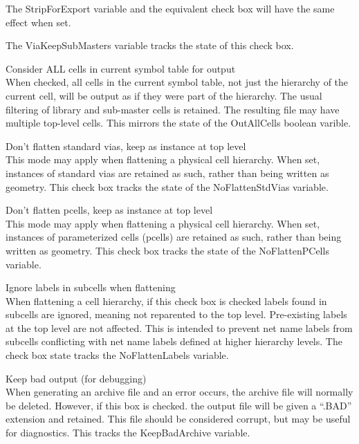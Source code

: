 \begin{description}
The {\et StripForExport} variable and the equivalent check box will
have the same effect when set.

The {\et ViaKeepSubMasters} variable tracks the state of this check
box.

\item{\cb Consider ALL cells in current symbol table for output}\\
When checked, all cells in the current symbol table, not just the
hierarchy of the current cell, will be output as if they were part of
the hierarchy.  The usual filtering of library and sub-master cells is
retained.  The resulting file may have multiple top-level cells.
This mirrors the state of the {\vt OutAllCells} boolean varible.

\item{\cb Don't flatten standard vias, keep as instance at top level}\\
This mode may apply when flattening a physical cell hierarchy.  When
set, instances of standard vias are retained as such, rather than
being written as geometry.  This check box tracks the state of the
{\et NoFlattenStdVias} variable.

\item{\cb Don't flatten pcells, keep as instance at top level}\\
This mode may apply when flattening a physical cell hierarchy.  When
set, instances of parameterized cells (pcells) are retained as such,
rather than being written as geometry.  This check box tracks the
state of the {\et NoFlattenPCells} variable.

\item{\cb Ignore labels in subcells when flattening}\\
When flattening a cell hierarchy, if this check box is checked labels
found in subcells are ignored, meaning not reparented to the top
level.  Pre-existing labels at the top level are not affected.  This
is intended to prevent net name labels from subcells conflicting with
net name labels defined at higher hierarchy levels.  The check box
state tracks the {\et NoFlattenLabels} variable.

\item{\cb Keep bad output (for debugging)}\\
When generating an archive file and an error occurs, the archive file
will normally be deleted.  However, if this box is checked.  the
output file will be given a ``{\vt .BAD}'' extension and retained. 
This file should be considered corrupt, but may be useful for
diagnostics.  This tracks the {\et KeepBadArchive} variable.
\end{description}

